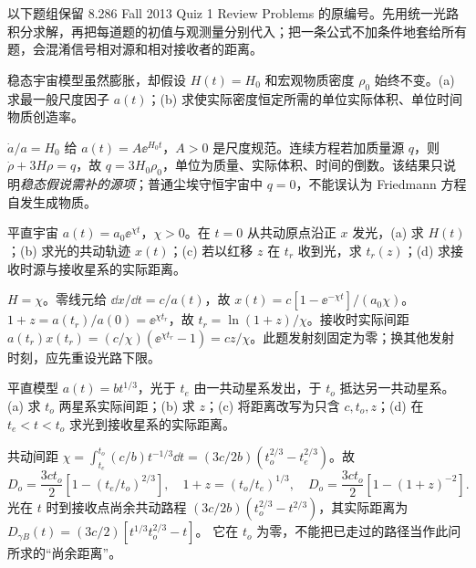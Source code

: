 以下题组保留 8.286 Fall 2013 Quiz 1 Review Problems 的原编号。先用统一光路积分求解，再把每道题的初值与观测量分别代入；把一条公式不加条件地套给所有题，会混淆信号相对源和相对接收者的距离。

\begin{exercise}
稳态宇宙模型虽然膨胀，却假设 $H(t)=H_0$ 和宏观物质密度 $\rho_0$ 始终不变。(a) 求最一般尺度因子 $a(t)$；(b) 求使实际密度恒定所需的单位实际体积、单位时间物质创造率。
\end{exercise}
\begin{solution}
$\dot a/a=H_0$ 给 $a(t)=A\ee^{H_0t}$，$A>0$ 是尺度规范。连续方程若加质量源 $q$，则 $\dot\rho+3H\rho=q$，故 $q=3H_0\rho_0$，单位为质量、实际体积、时间的倒数。该结果只说明\emph{稳态假说需补的源项}；普通尘埃守恒宇宙中 $q=0$，不能误认为 Friedmann 方程自发生成物质。
\end{solution}

\begin{exercise}
平直宇宙 $a(t)=a_0\ee^{\chi t}$，$\chi>0$。在 $t=0$ 从共动原点沿正 $x$ 发光，(a) 求 $H(t)$；(b) 求光的共动轨迹 $x(t)$；(c) 若以红移 $z$ 在 $t_r$ 收到光，求 $t_r(z)$；(d) 求接收时源与接收星系的实际距离。
\end{exercise}
\begin{solution}
$H=\chi$。零线元给 $\dd x/\dd t=c/a(t)$，故 $x(t)=c[1-\ee^{-\chi t}]/(a_0\chi)$。$1+z=a(t_r)/a(0)=\ee^{\chi t_r}$，故 $t_r=\ln(1+z)/\chi$。接收时实际间距 $a(t_r)x(t_r)=(c/\chi)(\ee^{\chi t_r}-1)=cz/\chi$。此题发射刻固定为零；换其他发射时刻，应先重设光路下限。
\end{solution}

\begin{exercise}
平直模型 $a(t)=bt^{1/3}$，光于 $t_e$ 由一共动星系发出，于 $t_o$ 抵达另一共动星系。(a) 求 $t_o$ 两星系实际间距；(b) 求 $z$；(c) 将距离改写为只含 $c,t_o,z$；(d) 在 $t_e<t<t_o$ 求光到接收星系的实际距离。
\end{exercise}
\begin{solution}
共动间距 $\chi=\int_{t_e}^{t_o}(c/b)t^{-1/3}\dd t=(3c/2b)(t_o^{2/3}-t_e^{2/3})$。故
\[
D_o=\frac{3ct_o}{2}\left[1-(t_e/t_o)^{2/3}\right],\quad
1+z=(t_o/t_e)^{1/3},\quad
D_o=\frac{3ct_o}{2}[1-(1+z)^{-2}].
\]
光在 $t$ 时到接收点尚余共动路程 $(3c/2b)(t_o^{2/3}-t^{2/3})$，其实际距离为
$D_{\gamma B}(t)=(3c/2)[t^{1/3}t_o^{2/3}-t]$。
它在 $t_o$ 为零，不能把已走过的路径当作此问所求的“尚余距离”。
\end{solution}

